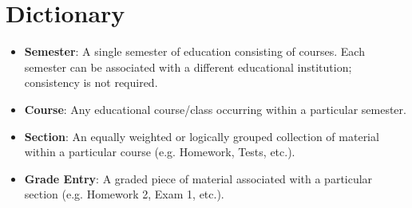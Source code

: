 \documentclass[12pt]{article}
\begin{document}
\section{Dictionary}
\begin{itemize}
    \item \textbf{Semester}: A single semester of education consisting of courses. Each semester can
    be associated with a different educational institution; consistency is not required.
    \item \textbf{Course}: Any educational course/class occurring within a particular semester.
    \item \textbf{Section}: An equally weighted or logically grouped collection of material within a
    particular course (e.g. Homework, Tests, etc.).
    \item \textbf{Grade Entry}: A graded piece of material associated with a particular section 
    (e.g. Homework 2, Exam 1, etc.).
\end{itemize}
\end{document}
